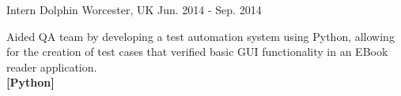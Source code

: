 \begin{cventries}
  \cventry
    {Intern} %
    {Dolphin} %
    {Worcester, UK} %
    {Jun. 2014 - Sep. 2014} %
    {
      \begin{cvitems} %
      \item {Aided QA team by developing a test automation system using Python, allowing for the creation of test cases that verified basic GUI functionality in an EBook reader application.\\\textbf{[Python]}}
      \end{cvitems}
    }

\end{cventries}
